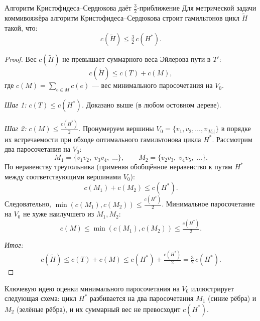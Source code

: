 \begin{Theorem}{Алгоритм Кристофидеса--Сердюкова даёт $\frac{3}{2}$-приближение}{}
	Для метрической задачи коммивояжёра алгоритм Кристофидеса--Сердюкова строит гамильтонов цикл $\widetilde{H}$ такой, что:
	\[
	c(\widetilde{H}) \leq \tfrac{3}{2}\,c(H^*).
	\]
\end{Theorem}

\begin{proof}
Вес $c(\widetilde{H})$ не превышает суммарного веса Эйлерова пути в $T'$:
\[
c(\widetilde{H}) \leq c(T) + c(M),
\]
где $c(M) = \sum_{e \in M} c(e)$ — вес минимального паросочетания на $V_0$.

\emph{Шаг 1: $c(T) \leq c(H^*)$.} Доказано выше (в любом остовном дереве).

\emph{Шаг 2: $c(M) \leq \tfrac{c(H^*)}{2}$.} Пронумеруем вершины $V_0 = \{v_1, v_2, \ldots, v_{|V_0|}\}$ в порядке их встречаемости при обходе оптимального гамильтонова цикла $H^*$. Рассмотрим два паросочетания на $V_0$:
\[
M_1 = \{v_1v_2,\; v_3v_4,\; \ldots\}, \qquad M_2 = \{v_2v_3,\; v_4v_5,\; \ldots\}.
\]
По неравенству треугольника (применяя обобщённое неравенство к путям $H^*$ между соответствующими вершинами $V_0$):
\[
c(M_1) + c(M_2) \leq c(H^*).
\]
Следовательно, $\min(c(M_1),c(M_2)) \leq \tfrac{c(H^*)}{2}$. Минимальное паросочетание на $V_0$ не хуже наилучшего из $M_1,M_2$:
\[
c(M) \leq \min(c(M_1),c(M_2)) \leq \tfrac{c(H^*)}{2}.
\]

\emph{Итог:}
\[
c(\widetilde{H}) \leq c(T) + c(M) \leq c(H^*) + \tfrac{c(H^*)}{2} = \tfrac{3}{2}\,c(H^*).
\]
\end{proof}

Ключевую идею оценки минимального паросочетания на $V_0$ иллюстрирует следующая схема: цикл $H^*$ разбивается на два паросочетания $M_1$ (синие рёбра) и $M_2$ (зелёные рёбра), и их суммарный вес не превосходит $c(H^*)$.

